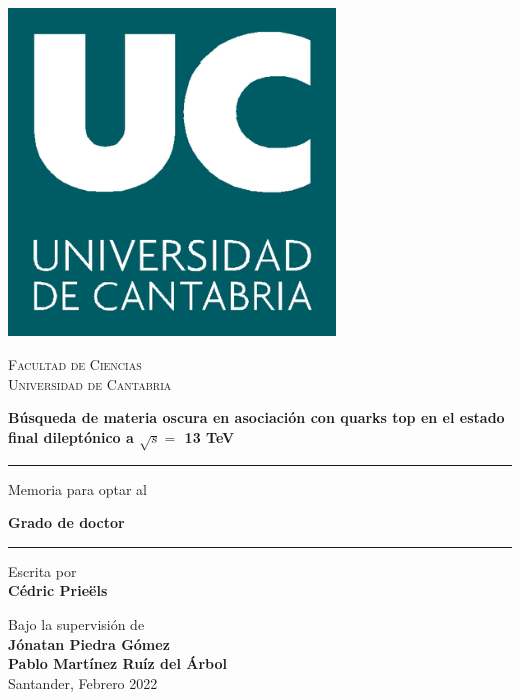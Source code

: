 \documentclass[a4paper, 10pt, openright]{report}
\begin{document}
\begin{titlepage}

	\centering
	\vspace*{-1.4cm}
	\begin{minipage}[t]{.29\textwidth}
	\includegraphics[width=0.65\textwidth]{figs/image_UC.png}
	\end{minipage}
	\begin{minipage}[t]{.69\textwidth}
	\begin{flushright}
	\vspace*{-2.6cm}
	{\scshape\LARGE Facultad de Ciencias \\ \vspace{-15pt} Universidad de Cantabria \par}
	\end{flushright}
	\end{minipage}	
	
	\vspace{2.5cm}
	
	{\huge\bfseries B\'{u}squeda de materia oscura en asociaci\'{o}n con quarks top en el estado final dilept\'{o}nico a $\sqrt{s} = $ 13 TeV\par \vspace{65pt}}
	\noindent\rule{15cm}{0.4pt}\par 
	
	{\vspace{10pt} \Large Memoria para optar al \par \vspace{-6pt} \LARGE \textbf{Grado de doctor} \vspace{20pt} \par \noindent\rule{15cm}{0.4pt}}	
	
	\vspace{0.8cm}
	{\Large Escrita por \\ \textbf{C\'{e}dric Prie\"{e}ls}\par}
	\vspace{0.5cm}
	{\Large Bajo la supervisi\'{o}n de \\ \textbf{J\'{o}natan Piedra G\'{o}mez} \\
	\vspace{-10pt}
	\textbf{Pablo Mart\'{i}nez Ru\'{i}z del \'{A}rbol}\\}
	\vspace{2.6cm}
	{\LARGE Santander, Febrero 2022}
	\vfill

\end{titlepage}
\end{document}
